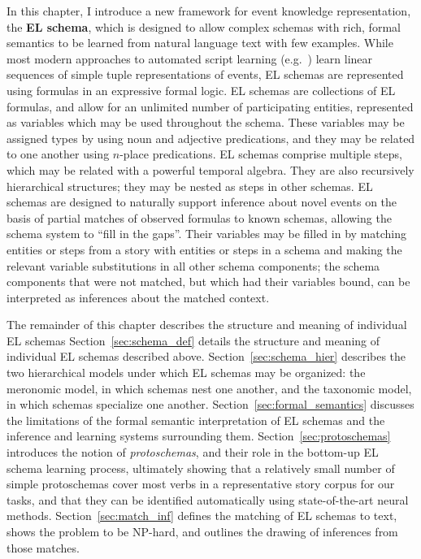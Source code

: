 
In this chapter, I introduce a new framework for event knowledge representation, the \textbf{EL schema}, which is designed to allow complex schemas with rich, formal semantics to be learned from natural language text with few examples.
While most modern approaches to automated script learning (e.g.~\cite{chambers2011ACL,pichotta2016WS,yuan2018OEP}) learn linear sequences of simple tuple representations of events, EL schemas are represented using formulas in an expressive formal logic.
EL schemas are collections of EL formulas, and allow for an unlimited number of participating entities, represented as variables which may be used throughout the schema.
These variables may be assigned types by using noun and adjective predications, and they may be related to one another using $n$-place predications.
EL schemas comprise multiple steps, which may be related with a powerful temporal algebra.
They are also recursively hierarchical structures; they may be nested as steps in other schemas. EL schemas are designed to naturally support inference about novel events on the basis of partial matches of observed formulas to known schemas, allowing the schema system to ``fill in the gaps''.
Their variables may be filled in by matching entities or steps from a story with entities or steps in a schema and making the relevant variable substitutions in all other schema components; the schema components that were not matched, but which had their variables bound, can be interpreted as inferences about the matched context.

The remainder of this chapter describes the structure and meaning of individual EL schemas Section~\ref{sec:schema_def} details the structure and meaning of individual EL schemas described above. Section~\ref{sec:schema_hier} describes the two hierarchical models under which EL schemas may be organized: the meronomic model, in which schemas nest one another, and the taxonomic model, in which schemas specialize one another. Section~\ref{sec:formal_semantics} discusses the limitations of the formal semantic interpretation of EL schemas and the inference and learning systems surrounding them. Section~\ref{sec:protoschemas} introduces the notion of \textit{protoschemas}, and their role in the bottom-up EL schema learning process, ultimately showing that a relatively small number of simple protoschemas cover most verbs in a representative story corpus for our tasks, and that they can be identified automatically using state-of-the-art neural methods. Section~\ref{sec:match_inf} defines the matching of EL schemas to text, shows the problem to be $\mathrm{NP}$-hard, and outlines the drawing of inferences from those matches.

